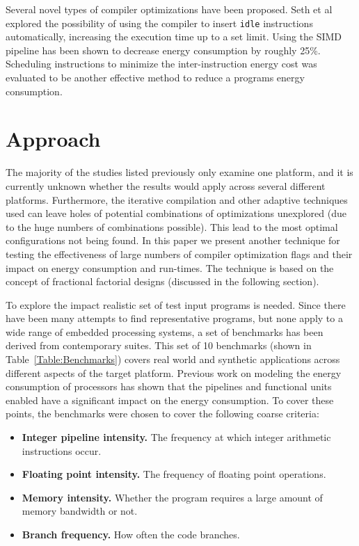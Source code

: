 \documentclass[twocolumn]{article}
\begin{document}
Several novel types of compiler optimizations have been proposed. Seth et al\cite{Seth2001} explored the possibility of using the compiler to insert \texttt{idle} instructions automatically, increasing the execution time up to a set limit. Using the SIMD pipeline has been shown to decrease energy consumption\cite{Ibrahim2009} by roughly 25\%. Scheduling instructions to minimize the inter-instruction energy cost was evaluated to be another effective method to reduce a programs energy consumption\cite{Parikh}.

\section{Approach}

The majority of the studies listed previously only examine one platform, and it is currently unknown whether the results would apply across several different platforms. Furthermore, the iterative compilation and other adaptive techniques used can leave holes of potential combinations of optimizations unexplored (due to the huge numbers of combinations possible). This lead to the most optimal configurations not being found. In this paper we present another technique for testing the effectiveness of large numbers of compiler optimization flags and their impact on energy consumption and run-times. The technique is based on the concept of fractional factorial designs (discussed in the following section).

To explore the impact  realistic set of test input programs is needed. Since there have been many attempts to find representative programs, but none apply to a wide range of embedded processing systems, a set of benchmarks has been derived from contemporary suites. This set of 10 benchmarks (shown in Table~\ref{Table:Benchmarks}) covers real world and synthetic applications across different aspects of the target platform. Previous work on modeling the energy consumption of processors has shown that the pipelines and functional units enabled have a significant impact on the energy consumption. To cover these points, the benchmarks were chosen to cover the following coarse criteria:
\begin{itemize}
	\setlength{\itemsep}{0em}
	\vspace{-1mm}
	\item \textbf{Integer pipeline intensity.} The frequency at which integer arithmetic instructions occur.
	\item \textbf{Floating point intensity.} The frequency of floating point operations.
	\item \textbf{Memory intensity.} Whether the program requires a large amount of memory bandwidth or not.
	\item \textbf{Branch frequency.} How often the code branches.
\end{itemize}
\end{document}
